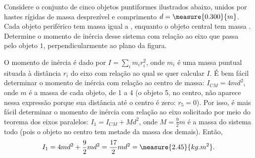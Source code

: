 \begin{question}
	Considere o conjunto de cinco objetos puntiformes ilustrados abaixo, unidos por hastes rígidas de massa desprezível e comprimento $d = \measure{0.300}{m}$.
	Cada objeto periférico tem massa igual a , enquanto o objeto central tem massa .
	Determine o momento de inércia desse sistema com relação ao eixo que passa pelo objeto $1$, perpendicularmente ao plano da figura.


	\begin{answer}
	\end{answer}

	\begin{solution}
		O momento de inércia é dado por $I = \sum_i m_i r_i^2$, onde $m_i$ é uma massa puntual situada à distância $r_i$ do eixo com relação ao qual se quer calcular $I$.
		É bem fácil determinar o momento de inércia com relação ao centro de massa: $I_{CM} = 4md^2$, onde $m$ é a massa de cada objeto, de 1 a 4 (o objeto 5, no centro, não aparece nessa expressão porque sua distância até o centro é zero: $r_5 = 0$).
		Por isso, é mais fácil determinar o momento de inércia com relação ao eixo solicitado por meio do teorema dos eixos paralelos: $I_1 = I_{CM} + Md^2$, onde $M = \frac{9}{2}m$ é a massa do sistema todo (pois o objeto no centro tem metade da massa dos demais).
		Então,
		\begin{equation*}
			I_1 = 4md^2 + \frac{9}{2}md^2 = \frac{17}{2}md^2 = \measure{2.45}{kg.m^2}.
		\end{equation*}
	\end{solution}
\end{question}
